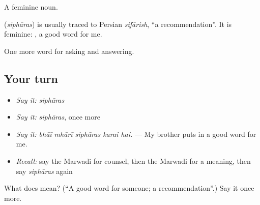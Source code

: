A feminine noun.

\begin{cousinweb}
\textbf{} (\emph{siphāras}) is usually traced to Persian \emph{sifārish}, \textquotedblleft{}a recommendation\textquotedblright{}. It is feminine: \textbf{ }, a good word for me.
\end{cousinweb}

\begin{grammarlens}[title={What you've built}]
One more word for asking and answering.
\end{grammarlens}

\subsection*{Your turn}
\begin{itemize}
\raggedright
  \item \emph{Say it:} \emph{siphāras}
  \item \emph{Say it:} \emph{siphāras}, once more
  \item \emph{Say it:} \emph{bhāī mhārī siphāras karai hai.} — My brother puts in a good word for me.
  \item \emph{Recall:} say the Marwadi for counsel, then the Marwadi for a meaning, then say \emph{siphāras} again
\end{itemize}

\begin{tcolorbox}[breakable,colback=teal!4,colframe=teal!35!black,title={Before you move on}]
What does  mean? (\textquotedblleft{}A good word for someone; a recommendation\textquotedblright{}.) Say it once more.
\end{tcolorbox}
